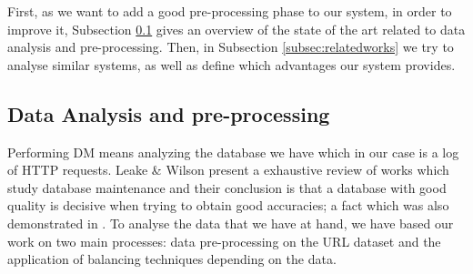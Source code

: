 \documentclass{llncs}
\begin{document}
First, as we want to add a good pre-processing phase to our system, in order to improve it, Subsection \ref{subsec:dataanalysis} gives an overview of the state of the art related to data analysis and pre-processing. Then, in Subsection \ref{subsec:relatedworks} we try to analyse similar systems, as well as define which advantages our system provides.

\subsection{Data Analysis and pre-processing}
\label{subsec:dataanalysis}

Performing DM means analyzing the database we have \cite{Frank2011}
which in our case is a log of HTTP requests. Leake \& Wilson
\cite{wilson2001maintaining} present a exhaustive review of works which
study database maintenance and their conclusion is that a database with
good quality is decisive when trying to obtain good accuracies; a fact
which was also demonstrated in \cite{zeineb2014thesis}. To analyse the
data that we have at hand, we have based our work on two main
processes: data pre-processing on
the URL dataset and the application of balancing
techniques depending on the data. 
\end{document}
